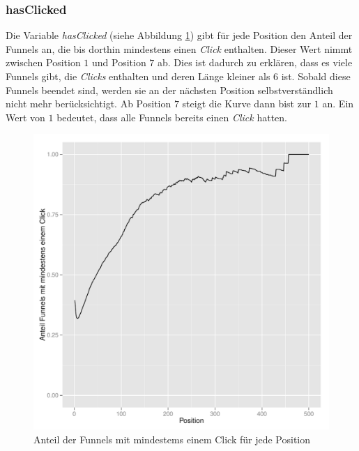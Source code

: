 \subsubsection*{hasClicked}
Die Variable \textit{hasClicked} (siehe Abbildung \ref{hasClicked}) gibt für jede Position den Anteil der Funnels an, die bis dorthin mindestens einen \textit{Click} enthalten. Dieser Wert nimmt zwischen Position $1$ und Position $7$ ab. Dies ist dadurch zu erklären, dass es viele Funnels gibt, die \textit{Clicks} enthalten und deren Länge kleiner als $6$ ist. Sobald diese Funnels beendet sind, werden sie an der nächsten Position selbstverständlich nicht mehr berücksichtigt. Ab Position $7$ steigt die Kurve dann bist zur $1$ an. Ein Wert von $1$ bedeutet, dass alle Funnels bereits einen \textit{Click} hatten.
\begin{figure}[H]
    \centering
    \includegraphics[scale=0.5]{hasClickedSucc.pdf}
    \caption{Anteil der Funnels mit mindestems einem Click für jede Position}
    \label{hasClicked}
\end{figure}

